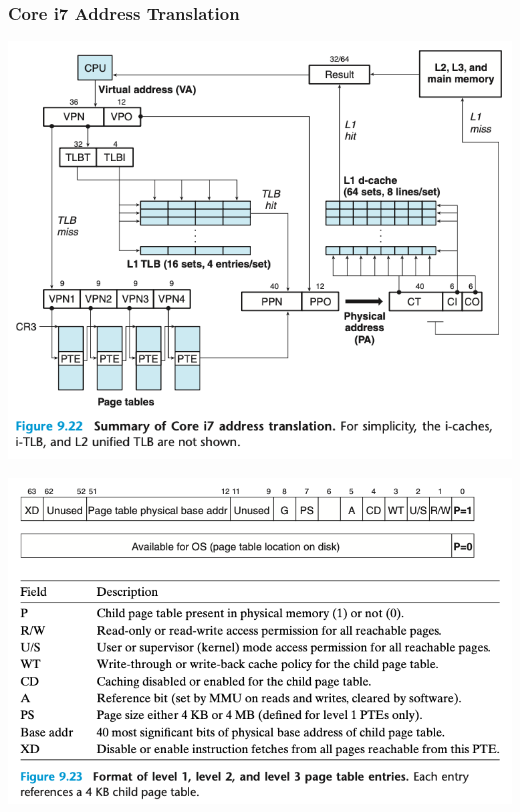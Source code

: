 \documentclass[11pt]{article}
\begin{document}
\subsubsection{Core i7 Address Translation}
\label{sec:org73ea182}

\begin{center}
\includegraphics[width=.9\linewidth]{pics/figure9.22-i7-address-translation.png}
\end{center}

\begin{center}
\includegraphics[width=.9\linewidth]{pics/figure9.23-table-entry.png}
\end{center}
\end{document}
